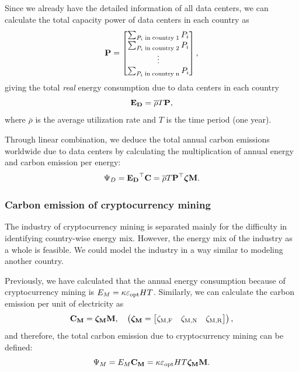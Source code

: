 \documentclass[12pt]{article}
\begin{document}
Since we already have the detailed information of all data centers, we can calculate the total capacity power of data centers in each country as
\begin{equation}
	\vb{P} = \begin{bmatrix}
		\sum_{P_i \rm\;in\;country\;1} P_i \\
		\sum_{P_i \rm\;in\;country\;2} P_i \\
		\vdots \\
		\sum_{P_i \rm\;in\;country\;n} P_i \\
	\end{bmatrix},
\end{equation}
giving the total \textit{real} energy consumption due to data centers in each country
\begin{equation}
	\vb{E_D} = \overline{\rho} T \vb{P},
\end{equation}
where $\overline{\rho}$ is the average utilization rate and $T$ is the time period (one year).

Through linear combination, we deduce the total annual carbon emissions worldwide due to data centers by calculating the multiplication of annual energy and carbon emission per energy:
\begin{equation}
	\Psi_D = \vb{E_D}^\top \vb{C} = \overline{\rho} T \vb{P}^\top \boldsymbol{\zeta} \vb{M}.
\end{equation}

\subsubsection{Carbon emission of cryptocurrency mining}

The industry of cryptocurrency mining is separated mainly for the difficulty in identifying country-wise energy mix. However, the energy mix of the industry as a whole is feasible. We could model the industry in a way similar to modeling another country.

Previously, we have calculated that the annual energy consumption because of cryptocurrency mining is $E_M = \kappa \varepsilon_{\rm opt} HT$. Similarly, we can calculate the carbon emission per unit of electricity as
\begin{equation}
	\vb{C_M} = \boldsymbol{\rm \zeta_M} \vb{M}, \quad
	\left(
		\boldsymbol{\rm \zeta_M} =
		\begin{bmatrix}
			\zeta_{\rm M, F} & \zeta_{\rm M, N} & \zeta_{\rm M, R} \\
		\end{bmatrix}
	\right),
\end{equation}
and therefore, the total carbon emission due to cryptocurrency mining can be defined:
\begin{equation}
	\Psi_M = E_M \vb{C_M} = \kappa \varepsilon_{\rm opt} HT \boldsymbol{\rm \zeta_M} \vb{M}.
\end{equation}
\end{document}
